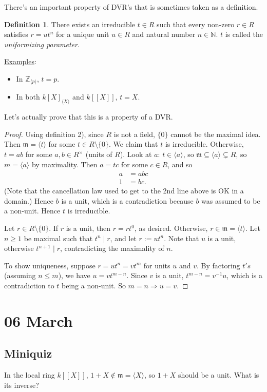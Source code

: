 \documentclass[12pt]{article}
\newcommand{\n}{\mathbb{N}}
\newcommand{\z}{\mathbb{Z}}
\newcommand{\ita}[1]{\textit{#1}}
\newcommand{\vbrack}[1]{\langle #1\rangle}
\theoremstyle{definition}
\newtheorem{definition}[theorem]{Definition}
\begin{document}
There's an important property of DVR's that is sometimes taken as a definition.
\begin{definition}
    There exists an irreducible $t\in R$ such that every non-zero $r\in R$ satisfies $r=ut^n$ for a unique unit $u\in R$ and natural number $n\in\n$. $t$ is called the \ita{uniformizing parameter}.
\end{definition}
\underline{Examples}:
\begin{itemize}
    \item In $\z_{\vbrack{p}}$, $t=p$.
    \item In both $k[X]_{\vbrack{X}}$ and $k[[X]]$, $t=X$.
\end{itemize}
Let's actually prove that this is a property of a DVR.
\begin{proof}
    Using definition 2), since $R$ is not a field, $\{0\}$ cannot be the maximal idea. Then $\mathfrak{m}=\vbrack{t}$ for some $t\in R\setminus\{0\}$. We claim that $t$ is irreducible. Otherwise, $t=ab$ for some $a,b\in R^{\times}$ (units of $R$). Look at $a$: $t\in\vbrack{a}$, so $\mathfrak{m}\subseteq\vbrack{a}\subsetneq R$, so $m=\vbrack{a}$ by maximality. Then $a=tc$ for some $c\in R$, and so
    \begin{align*}
        a&=abc\\
        1&=bc.
    \end{align*}
    (Note that the cancellation law used to get to the 2nd line above is OK in a domain.) Hence $b$ is a unit, which is a contradiction because $b$ was assumed to be a non-unit. Hence $t$ is irreducible. \checkmark
    
    Let $r\in R\setminus\{0\}$. If $r$ is a unit, then $r=rt^0$, as desired. Otherwise, $r\in\mathfrak{m}=\vbrack{t}$. Let $n\geq1$ be maximal such that $t^n\mid r$, and let $r:=ut^n$. Note that $u$ is a unit, otherwise $t^{n+1}\mid r$, contradicting the maximality of $n$. \checkmark
    
    To show uniqueness, suppose $r=ut^n=vt^m$ for units $u$ and $v$. By factoring $t's$ (assuming $n\leq m$), we have $u=vt^{m-n}$. Since $v$ is a unit, $t^{m-n}=v^{-1}u$, which is a contradiction to $t$ being a non-unit. So $m=n\Rightarrow u=v$. \checkmark
\end{proof}
\section{06 March}
\subsection{Miniquiz}
In the local ring $k[[X]]$, $1+X\notin\mathfrak{m}=\vbrack{X}$, so $1+X$ should be a unit. What is its inverse?
\end{document}
